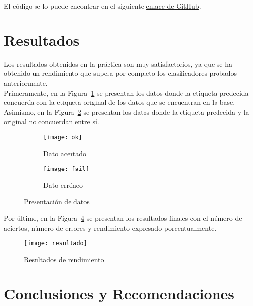 \documentclass[10pt,a4paper]{article}
\begin{document}
El código se lo puede encontrar en el siguiente \href{https://github.com/JampyVi98/Sistemas-Embebidos/tree/master/Examen_Perceptron}{enlace de GitHub}.

\section{Resultados}
Los resultados obtenidos en la práctica son muy satisfactorios, ya que se ha obtenido un rendimiento que supera por completo los clasificadores probados anteriormente.\\

Primeramente, en la Figura~\ref{ok} se presentan los datos donde la etiqueta predecida concuerda con la etiqueta original de los datos que se encuentran en la base. Asimismo, en la Figura~\ref{f} se presentan los datos donde la etiqueta predecida y la original no concuerdan entre sí.

\begin{figure}[htbp]
\centering

\begin{subfigure}{7a}
\texttt{[image: ok]}
\caption{Dato acertado}
\label{ok}
\end{subfigure}

\begin{subfigure}{7b}
\texttt{[image: fail]}
\caption{Dato erróneo}
\label{f}
\end{subfigure}

\caption{Presentación de datos}
\label{datos}
\end{figure}

Por último, en la Figura~\ref{res} se presentan los resultados finales con el número de aciertos, número de errores y rendimiento expresado porcentualmente.


\begin{figure}[H]
\centering
\texttt{[image: resultado]}
\caption{Resultados de rendimiento}
\label{res}
\end{figure}

\section{Conclusiones y Recomendaciones}
\end{document}
